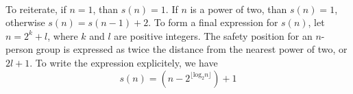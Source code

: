 \documentclass{article}
\begin{document}
\\[0.05in] To reiterate, if $n = 1$, than $s(n) = 1$. If $n$ is a power of two, than $s(n) = 1$, otherwise $s(n) = s(n-1) + 2$. To form a final expression for $s(n)$, let $n = 2^k + l$, where $k$ and $l$ are positive integers. The safety position for an $n$-person group is expressed as twice the distance from the nearest power of two, or $2l + 1$. To write the expression explicitely, we have 
\begin{equation*}
s(n) = \left (n - 2^{\lfloor \text{log}_2n \rfloor} \right ) + 1
\end{equation*}
\end{document}
